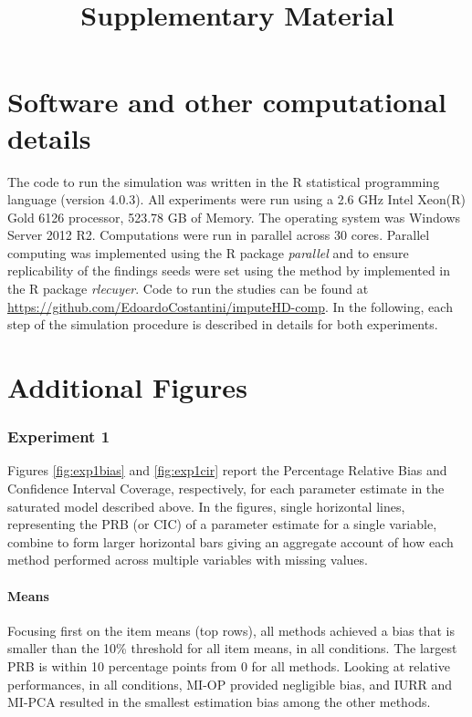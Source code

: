 \documentclass[11pt]{article}
\title{Supplementary Material}
\begin{document}
\maketitle

\section{Software and other computational details}

The code to run the simulation was written in the R statistical programming language (version 4.0.3). 
All experiments were run using a 2.6 GHz Intel Xeon(R) Gold 6126 processor, 523.78 GB of Memory. The
operating system was Windows Server 2012 R2.
Computations were run in parallel across 30 cores. 
Parallel computing was implemented using the R package \emph{parallel} and to ensure replicability 
of the findings seeds were set using the method by \cite{lecuyer:2002} implemented in the R package 
\emph{rlecuyer}.
Code to run the studies can be found at \url{https://github.com/EdoardoCostantini/imputeHD-comp}.
In the following, each step of the simulation procedure is described in details for both experiments.

\section{Additional Figures}

\subsubsection{Experiment 1}

	Figures \ref{fig:exp1bias} and \ref{fig:exp1cir} report the Percentage Relative Bias and Conﬁdence Interval 
	Coverage, respectively, for each parameter estimate in the saturated model described above. 
	In the figures, single horizontal lines, representing the PRB (or CIC) of a parameter estimate for a single 
	variable, combine to form larger horizontal bars giving an aggregate account of how each method performed 
	across multiple variables with missing values.

	\paragraph{Means} 
	Focusing first on the item means (top rows), all methods achieved a bias that is smaller than the 10\% threshold 
	for all item means, in all conditions.
	The largest PRB is within 10 percentage points from 0 for all methods.
	Looking at relative performances, in all conditions, MI-OP provided negligible bias, and IURR and MI-PCA resulted 
	in the smallest estimation bias among the other methods.
	
\end{document}
